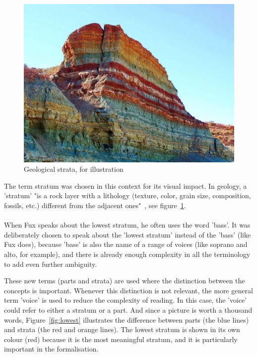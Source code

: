 \paragraph{}
\begin{figure}
    \centering
    \includegraphics[width=\linewidth]{Images/rainbow-sediment.jpg}
    \caption{Geological strata, for illustration}
    \label{fig:geological-strata}
\end{figure}

The term stratum was chosen in this context for its visual impact. In geology, a 'stratum' "is a rock layer with a lithology (texture, color, grain size, composition, fossils, etc.) different from the adjacent ones"~\cite{mcnair2023}, see figure~\ref{fig:geological-strata}.
\paragraph{}
When Fux speaks about the lowest stratum, he often uses the word 'bass'. It was deliberately chosen to speak about the 'lowest stratum' instead of the 'bass' (like Fux does), because 'bass' is also the name of a range of voices (like soprano and alto, for example), and there is already enough complexity in all the terminology to add even further ambiguity.

These new terms (parts and strata) are used where the distinction between the concepts is important. Whenever this distinction is not relevant, the more general term 'voice' is used to reduce the complexity of reading. In this case, the 'voice' could refer to either a stratum or a part. And since a picture is worth a thousand words, Figure~\ref{fig:lowest} illustrates the difference between parts (the blue lines) and strata (the red and orange lines). The lowest stratum is shown in its own colour (red) because it is the most meaningful stratum, and it is particularly important in the formalisation.

